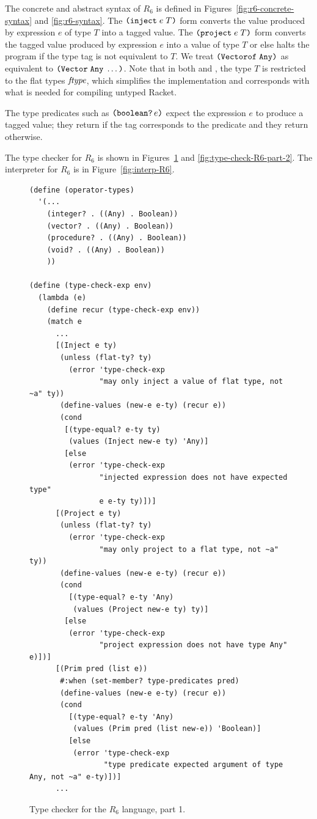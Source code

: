 \documentclass[11pt]{book}
\begin{document}
The concrete and abstract syntax of $R_6$ is defined in
Figures~\ref{fig:r6-concrete-syntax} and \ref{fig:r6-syntax}.  The
$\texttt{(}\texttt{inject}\; e\; T\texttt{)}$ form converts the value produced by
expression $e$ of type $T$ into a tagged value.  The
$\texttt{(}\texttt{project}\;e\;T\texttt{)}$ form converts the tagged value produced by
expression $e$ into a value of type $T$ or else halts the program if
the type tag is not equivalent to $T$. We treat
$\texttt{(}\texttt{Vectorof}\;\texttt{Any}\texttt{)}$ as equivalent to
$\texttt{(}\texttt{Vector}\;\texttt{Any}\;\ldots\texttt{)}$.
%
Note that in both  and , the type $T$ is
restricted to the flat types $\mathit{ftype}$, which simplifies the
implementation and corresponds with what is needed for compiling
untyped Racket.

The type predicates such as $\texttt{(}\texttt{boolean?}\,e\texttt{)}$ expect the
expression $e$ to produce a tagged value; they return  if the
tag corresponds to the predicate and they return  otherwise.

The type checker for $R_6$ is shown in Figures~\ref{fig:type-check-R6-part-1}
and \ref{fig:type-check-R6-part-2}.
The interpreter for $R_6$ is in Figure~\ref{fig:interp-R6}.

\begin{figure}[btp]
 \begin{lstlisting}[basicstyle=\ttfamily\footnotesize]
(define (operator-types)
  '(...
    (integer? . ((Any) . Boolean))
    (vector? . ((Any) . Boolean))
    (procedure? . ((Any) . Boolean))
    (void? . ((Any) . Boolean))
    ))
    
(define (type-check-exp env)
  (lambda (e)
    (define recur (type-check-exp env))
    (match e
      ...  
      [(Inject e ty)
       (unless (flat-ty? ty)
         (error 'type-check-exp
                "may only inject a value of flat type, not ~a" ty))
       (define-values (new-e e-ty) (recur e))
       (cond
        [(type-equal? e-ty ty)
         (values (Inject new-e ty) 'Any)]
        [else
         (error 'type-check-exp
                "injected expression does not have expected type" 
                e e-ty ty)])]
      [(Project e ty)
       (unless (flat-ty? ty)
         (error 'type-check-exp
                "may only project to a flat type, not ~a" ty))
       (define-values (new-e e-ty) (recur e))
       (cond
         [(type-equal? e-ty 'Any)
          (values (Project new-e ty) ty)]
        [else
         (error 'type-check-exp
                "project expression does not have type Any" e)])]
      [(Prim pred (list e))
       #:when (set-member? type-predicates pred)
       (define-values (new-e e-ty) (recur e))
       (cond
         [(type-equal? e-ty 'Any)
          (values (Prim pred (list new-e)) 'Boolean)]
         [else
          (error 'type-check-exp
                 "type predicate expected argument of type Any, not ~a" e-ty)])]
      ...
\end{lstlisting}
\caption{Type checker for the $R_6$ language, part 1.}
\label{fig:type-check-R6-part-1}
\end{figure}
\end{document}
